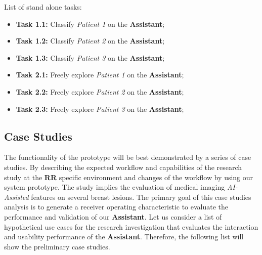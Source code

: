 \hfill


List of stand alone tasks:


\hfill

\begin{itemize}
\item[] \textbf{Task 1.1:} Classify \textit{Patient 1} on the \textbf{Assistant};
\item[] \textbf{Task 1.2:} Classify \textit{Patient 2} on the \textbf{Assistant};
\item[] \textbf{Task 1.3:} Classify \textit{Patient 3} on the \textbf{Assistant};
\end{itemize}

\hfill

\begin{itemize}
\item[] \textbf{Task 2.1:} Freely explore \textit{Patient 1} on the \textbf{Assistant};
\item[] \textbf{Task 2.2:} Freely explore \textit{Patient 2} on the \textbf{Assistant};
\item[] \textbf{Task 2.3:} Freely explore \textit{Patient 3} on the \textbf{Assistant};
\end{itemize}

\hfill


























\subsection{Case Studies}

The functionality of the prototype will be best demonstrated by a series of case studies. By describing the expected workflow and capabilities of the research study at the \textbf{RR} specific environment and changes of the workflow by using our system prototype. The study implies the evaluation of medical imaging \textit{AI-Assisted} features on several breast lesions. The primary goal of this case studies analysis is to generate a receiver operating characteristic to evaluate the performance and validation of our \textbf{Assistant}. Let us consider a list of hypothetical use cases for the research investigation that evaluates the interaction and usability performance of the \textbf{Assistant}. Therefore, the following list will show the preliminary case studies.

